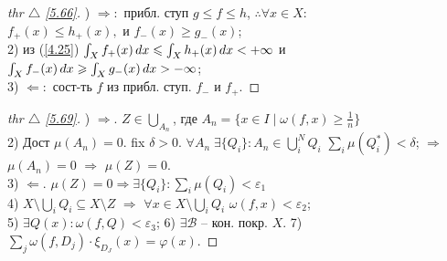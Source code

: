 \begin{minipage}[]{0.45\textwidth}
\begin{proof}[
thr $\triangle$
\eqref{5.66}]

\phantom{42}

) $\Rightarrow:$ прибл. ступ $g \leq f \leq h$, $\therefore \forall x \in X:$ $f_+ (x) \leq h_+(x), \text{ и } f_-(x) \geq g_-(x)$;\\
2) из (\ref{4.25}) $\int_X f_+(x) \, d x \leqslant \int_X h_+(x) \, d x < + \infty$ и \\
$\int_X f_-(x) \, d x \geqslant \int_X g_- (x) \, d x > -\infty$;\\
3) $\Leftarrow:$ сост-ть $f$ из прибл. ступ. $f_-$ и $f_+$.

\end{proof}
\end{minipage}
\hfill
\begin{minipage}[]{0.47\textwidth}
\begin{proof}[
 thr $\triangle$
\eqref{5.69}]

\phantom{42}

) $\boxed{\Rightarrow}$. $Z \in \bigcup_{A_n}$, где $A_n = \{x\in I \mid \omega(f, x) \geq \frac{1}{n}\}$ \\
2) Дост $\mu(A_n)=0$. fix $\delta > 0$.
$\forall A_n \; \exists \{Q_i\} \colon A_n \in \bigcup_i^N Q_i$ 
$\sum_i \mu(Q^*_i) < \delta$;
$\Rightarrow$ $\mu(A_n) = 0$ $\Rightarrow$ $\mu(Z) = 0$. \\
3) $\boxed{\Leftarrow}$. $\mu(Z) = 0 \Rightarrow \exists \{Q_i\}
\colon \sum_i \mu(Q_i) < \varepsilon_1$ \\
4) $X \setminus \bigcup_i Q_i \subseteq X \setminus Z$ $\Rightarrow$ $\forall x \in X \setminus \bigcup_i Q_i$ $\omega(f, x) < \varepsilon_2$;\\
5) $\exists Q(x) \colon \omega(f, Q) < \varepsilon_3$;
6) $\exists \mathcal{B}$ -- кон. покр. $X$. 
7) $\sum_j \omega(f, D_j) \cdot \xi_{D_J} (x) = \varphi(x)$.
\end{proof}
\end{minipage}